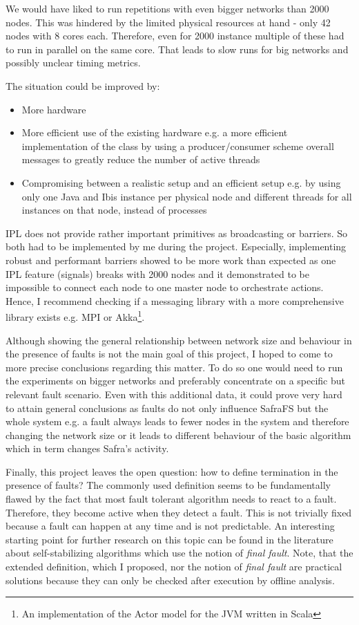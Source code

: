 We would have liked to run repetitions with even bigger networks than 2000 nodes.
This was hindered by the limited physical resources at hand - only 42 nodes with 8 cores each.
Therefore, even for 2000 instance multiple of these had to run in parallel on the same core.
That leads to slow runs for big networks and possibly unclear timing metrics.

The situation could be improved by:
\begin{itemize}
    \item More hardware
    \item More efficient use of the existing hardware e.g. a more efficient implementation of the  class by using a producer/consumer scheme overall messages to greatly reduce the number of active threads
    \item Compromising between a realistic setup and an efficient setup e.g. by using only one Java and Ibis instance per physical node and different threads for all instances on that node, instead of processes
\end{itemize}


IPL does not provide rather important primitives as broadcasting or barriers.
So both had to be implemented by me during the project.
Especially, implementing robust and performant barriers showed to be more work than expected as one IPL feature (signals) breaks with 2000 nodes and it demonstrated to be impossible to connect each node to one master node to orchestrate actions.
Hence, I recommend checking if a messaging library with a more comprehensive library exists e.g. MPI or Akka\footnote{An implementation of the Actor model for the JVM written in Scala}.

Although showing the general relationship between network size and behaviour in the presence of faults is not the main goal of this project, I hoped to come to more precise conclusions regarding this matter.
To do so one would need to run the experiments on bigger networks and preferably concentrate on a specific but relevant fault scenario.
Even with this additional data, it could prove very hard to attain general conclusions as faults do not only influence SafraFS but the whole system e.g. a fault always leads to fewer nodes in the system and therefore changing the network size or it leads to different behaviour of the basic algorithm which in term changes Safra's activity.

Finally, this project leaves the open question: how to define termination in the presence of faults?
The commonly used definition seems to be fundamentally flawed by the fact that most fault tolerant algorithm needs to react to a fault.
Therefore, they become active when they detect a fault.
This is not trivially fixed because a fault can happen at any time and is not predictable.
An interesting starting point for further research on this topic can be found in the literature about self-stabilizing algorithms which use the notion of \textit{final fault}.
Note, that the extended definition, which I proposed, nor the notion of \textit{final fault} are practical solutions because they can only be checked after execution by offline analysis.